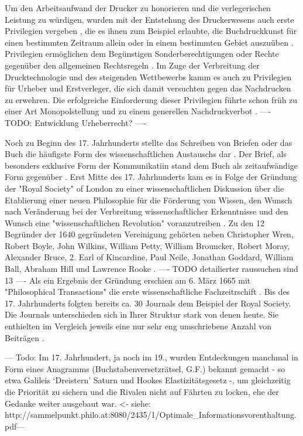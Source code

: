 Um den Arbeitsaufwand der Drucker zu honorieren und die verlegerischen Leistung zu würdigen\cite{szilagyi_2011_leistungsschutzrecht}, wurden mit der Entstehung des Druckerwesens auch erste Privilegien vergeben \cite{gieseke_1995_privileg}, die es ihnen zum Beispiel erlaubte, die Buchdruckkunst für einen bestimmten Zeitraum allein oder in einem bestimmten Gebiet auszuüben \cite{martin2008publizistische} \cite{koller_1995_Urheberrecht}. Privilegien ermöglichen dem Begünstigen Sonderberechtigungen oder Rechte gegenüber den allgemeinen Rechtsregeln \cite{jänich_2002_geistiges}. Im Zuge der Verbreitung der Drucktechnologie und des steigenden Wettbewerbs kamm es auch zu Privilegien für Urheber und Erstverleger, die sich damit versuchten gegen das Nachdrucken zu erwehren. Die erfolgreiche Einforderung dieser Privilegien führte schon früh zu einer Art Monopolstellung  und zu einem generellen Nachdruckverbot \cite{szilagyi_2011_leistungsschutzrecht}. ---- TODO: Entwicklung Urheberrecht? ----

Noch zu Beginn des 17. Jahrhunderts stellte das Schreiben von Briefen oder das Buch die häufigste Form des wissenschaftlichen Austauschs dar \cite{porter_1964_scientific}. Der Brief, als besonders exklusive Form der Kommunikatiin stand dem Buch als zeitaufwändige Form gegenüber \cite{fecher_hiig_2014}. Erst Mitte des 17. Jahrhunderts kam es in Folge der Gründung der "Royal Society" of London zu einer wissenschaftlichen Diskussion über die Etablierung einer neuen Philosophie für die Förderung von Wissen, den Wunsch nach Veränderung bei der Verbreitung wissenschaftlicher Erkenntnisse und den Wunsch eine "wissenschaftlichen Revolution" voranzutreiben \cite{Dear_1985}. Zu den 12 Begründer der 1640 gegründeten Vereinigung gehörten neben Christopher Wren, Robert Boyle, John Wilkins, William Petty, William Brouncker, Robert Moray, Alexander Bruce, 2. Earl of Kincardine, Paul Neile, Jonathan Goddard, William Ball, Abraham Hill und Lawrence Rooke \cite{suchen}. ---- TODO detailierter raussuchen sind 13 ---- Als ein Ergebnis der Gründung erschien am 6. März 1665 mit "Philosophical Transactions" die erste wissenschaftliche Fachzeitrschift \cite{suchen}. Bis des 17. Jahrhunderts folgten bereits ca. 30 Journals dem Beispiel der Royal Society. Die Journals unterschieden sich in Ihrer Struktur stark von denen heute. Sie enthielten im Vergleich jeweils eine nur sehr eng umschriebene Anzahl von Beiträgen \cite{suchen}.

--- Todo: Im 17. Jahrhundert, ja noch im 19., wurden Entdeckungen manchmal in Form eines Anagramms (Buchstabenversetzrätsel, G.F.) bekannt gemacht - so etwa Galileis ‘Dreistern’ Saturn und Hookes Elastizitätsgesetz -, um gleichzeitig die Priorität zu sichern und die Rivalen nicht auf Fährten zu locken, ehe der Gedanke weiter ausgebaut war. <- siehe: http://sammelpunkt.philo.at:8080/2435/1/Optimale_Informationsvorenthaltung.pdf---

